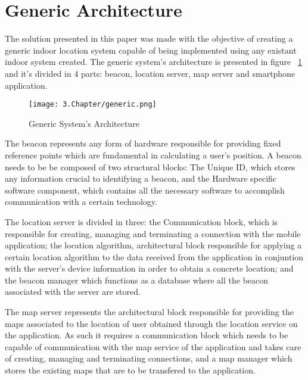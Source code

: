 \section{Generic Architecture}
\label{sec:generic}


The solution presented in this paper was made with the objective of creating a generic indoor location system capable of being implemented using any existant indoor system created. The generic system's architecture is presented in figure ~\ref{fig:generic} and it's divided in 4 parts: beacon, location server, map server and smartphone application. 

\begin{figure}
	\centering
		\texttt{[image: 3.Chapter/generic.png]}
	\caption[Generic System's Architecture]{Generic System's Architecture}
	\label{fig:generic}
\end{figure}

The beacon represents any form of hardware responsible for providing fixed reference points which are fundamental in calculating a user's position. A beacon needs to be be composed of two structural blocks: The Unique ID, which stores any information crucial to identifying a beacon, and the Hardware specific software component, which contains all the necessary software to accomplish communication with a certain technology. 

The location server is divided in three: the Communication block, which is responsible for creating, managing and terminating a connection with the mobile application; the location algorithm, architectural block responsible for applying a certain location algorithm to the data received from the application in conjuntion with the server's device information in order to obtain a concrete location; and the beacon manager which functions as a database where all the beacon associated with the server are stored.

The map server represents the architectural block responsible for providing the maps associated to the location of user obtained through the location service on the application. As such it requires a communication block which needs to be capable of communication with the map service of the application and takes care of creating, managing and terminating connections, and a map manager which stores the existing maps that are to be transfered to the application.

